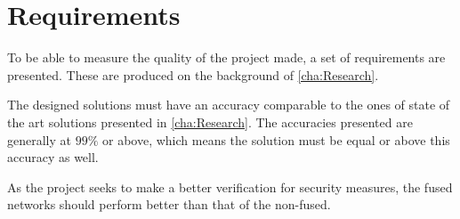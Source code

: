 \chapter{Requirements}\label{ch:req}
To be able to measure the quality of the project made, a set of requirements are presented. These are produced on the background of \autoref{cha:Research}.

The designed solutions must have an accuracy comparable to the ones of state of the art solutions presented in \autoref{cha:Research}. The accuracies presented are generally at $99\%$ or above, which means the solution must be equal or above this accuracy as well.

As the project seeks to make a better verification for security measures, the fused networks should perform better than that of the non-fused.

